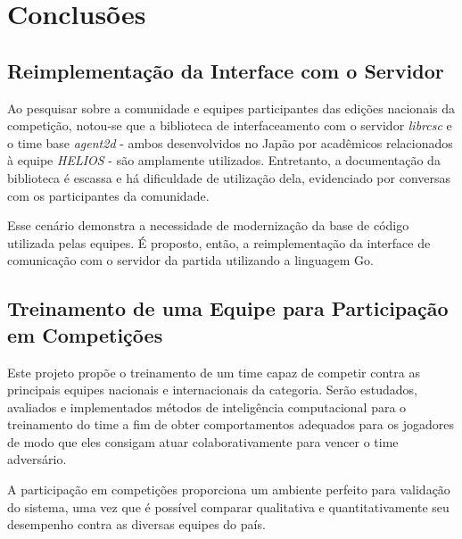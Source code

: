 
\chapter{Conclusões}

\label{CapConclusoes}


\section{Reimplementação da Interface com o Servidor}
\par Ao pesquisar sobre a comunidade e equipes participantes das edições nacionais da competição, notou-se que a biblioteca de interfaceamento com o servidor \textit{librcsc} e o time base \textit{agent2d} - ambos desenvolvidos no Japão por acadêmicos relacionados à equipe \textit{HELIOS} - são amplamente utilizados. Entretanto, a documentação da biblioteca é escassa e há dificuldade de utilização dela, evidenciado por conversas com os participantes da comunidade.

\par Esse cenário demonstra a necessidade de modernização da base de código utilizada pelas equipes.
É proposto, então, a reimplementação da interface de comunicação com o servidor da partida utilizando a linguagem Go.

\section{Treinamento de uma Equipe para Participação em Competições}
\par Este projeto propõe o treinamento de um time capaz de competir contra as principais equipes nacionais e internacionais da categoria.
Serão estudados, avaliados e implementados métodos de inteligência computacional para o treinamento do time a fim de obter comportamentos adequados para os jogadores de modo que eles consigam atuar colaborativamente para vencer o time adversário.

A participação em competições proporciona um ambiente perfeito para validação do sistema, uma vez que é possível comparar qualitativa e quantitativamente seu desempenho contra as diversas equipes do país.
